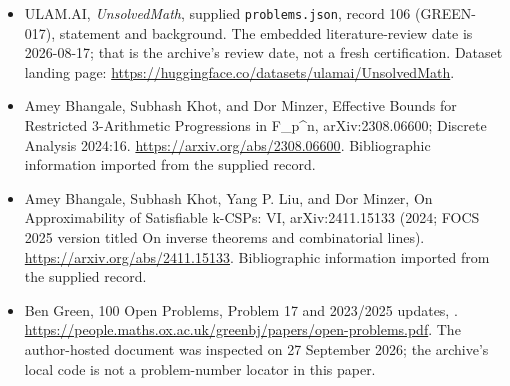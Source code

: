 \documentclass[11pt,a4paper]{article}
\begin{document}
{\small

\begin{itemize}

\item[\hypertarget{source:106:1}{S1}] ULAM.AI, \emph{UnsolvedMath}, supplied \texttt{problems.json}, record 106 (GREEN-017), statement and background. The embedded literature-review date is 2026-08-17; that is the archive’s review date, not a fresh certification. Dataset landing page: \url{https://huggingface.co/datasets/ulamai/UnsolvedMath}.

\item[\hypertarget{source:106:2}{S2}] Amey Bhangale, Subhash Khot, and Dor Minzer, Effective Bounds for Restricted 3-Arithmetic Progressions in F\_p\textasciicircum{}n, arXiv:2308.06600; Discrete Analysis 2024:16. \url{https://arxiv.org/abs/2308.06600}. Bibliographic information imported from the supplied record.

\item[\hypertarget{source:106:3}{S3}] Amey Bhangale, Subhash Khot, Yang P. Liu, and Dor Minzer, On Approximability of Satisfiable k-CSPs: VI, arXiv:2411.15133 (2024; FOCS 2025 version titled On inverse theorems and combinatorial lines). \url{https://arxiv.org/abs/2411.15133}. Bibliographic information imported from the supplied record.

\item[\hypertarget{source:106:4}{S4}] Ben Green, 100 Open Problems, Problem 17 and 2023/2025 updates, . \url{https://people.maths.ox.ac.uk/greenbj/papers/open-problems.pdf}. The author-hosted document was inspected on 27 September 2026; the archive’s local code is not a problem-number locator in this paper.

\end{itemize}

}

\label{end:106}
\end{document}
